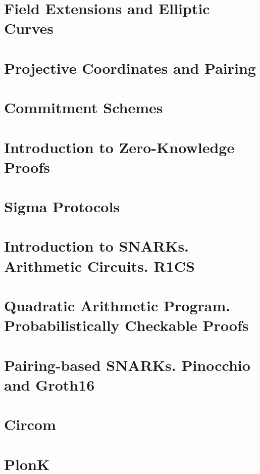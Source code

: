 \documentclass{zkdl-template}
\begin{document}
\section{Field Extensions and Elliptic Curves}

\label{section:field_extensions}

\section{Projective Coordinates and Pairing}



\section{Commitment Schemes}



\section{Introduction to Zero-Knowledge Proofs}

\label{section:zk}

\section{Sigma Protocols}



\section{Introduction to SNARKs. Arithmetic Circuits. R1CS}

\label{section:circuits}

\section{Quadratic Arithmetic Program. Probabilistically Checkable Proofs}



\section{Pairing-based SNARKs. Pinocchio and Groth16}



\section{Circom}



\section{PlonK}


\end{document}
